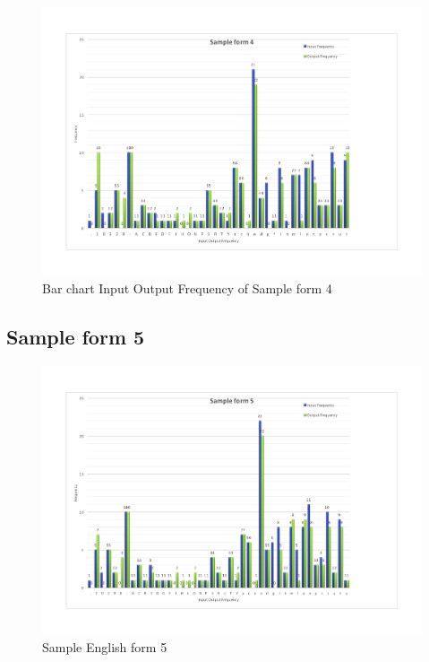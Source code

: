 \begin{figure}[H]
\centering
\includegraphics[width=1\textwidth]{form4.pdf}
\caption {Bar chart Input Output Frequency of Sample form 4}
\label {fig:bar4}
\end{figure}

\subsection{Sample form 5}

\begin{figure}[H]
\centering
\includegraphics[width=1\textwidth]{form5}
\caption {Sample English form 5}
\label {fig:form4}
\end{figure}


